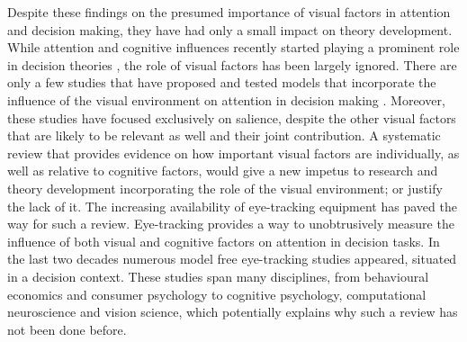 \documentclass[english,natbib,man,floatsintext]{apa6}
\begin{document}
Despite these findings on the presumed importance of visual factors in attention and decision making, they have had only a small impact on theory development. While attention and cognitive influences recently started playing a prominent role in decision theories \citep{callaway2019a, gluth2018, gluth2020, krajbich2010a, noguchi2018, thomas2019, usher2019}, the role of visual factors has been largely ignored. There are only a few studies that have proposed and tested models that incorporate the influence of the visual environment on attention in decision making \citep{chen2013, navalpakkam2010, towal2013a}. Moreover, these studies have focused exclusively on salience, despite the other visual factors that are likely to be relevant as well and their joint contribution. A systematic review that provides evidence on how important visual factors are individually, as well as relative to cognitive factors, would give a new impetus to research and theory development incorporating the role of the visual environment; or justify the lack of it. The increasing availability of eye-tracking equipment has paved the way for such a review. Eye-tracking provides a way to unobtrusively measure the influence of both visual and cognitive factors on attention in decision tasks. In the last two decades numerous model free eye-tracking studies appeared, situated in a decision context. These studies span many disciplines, from behavioural economics and consumer psychology to cognitive psychology, computational neuroscience and vision science, which potentially explains why such a review has not been done before.\\

\end{document}
